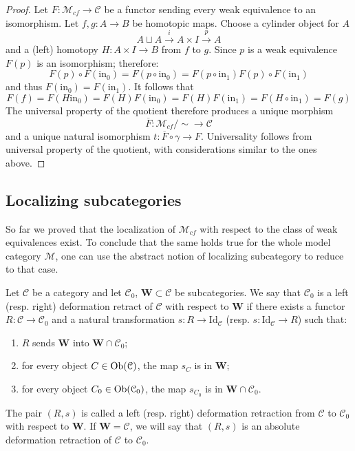 \begin{refsection}
\begin{proof}
Let $F \colon \mathcal M_{cf} \to \mathcal C$ be a functor sending every weak equivalence to an isomorphism. Let $f,g \colon A \to B$ be homotopic maps. Choose a cylinder object for $A$
\[
A \sqcup A \xrightarrow{i} A \times I \xrightarrow{p} A
\]
and a (left) homotopy $H \colon A \times I \to B$ from $f$ to $g$. Since $p$ is a weak equivalence $F(p)$ is an isomorphism; therefore:
\[
F(p) \circ F(\mathrm{in}_0) = F(p \circ \mathrm{in}_0) = F(p \circ \mathrm{in}_1) F(p) \circ F(\mathrm{in}_1)
\]
and thus $F(\mathrm{in}_0) = F(\mathrm{in}_1)$. It follows that
\[
F(f) = F(H \mathrm{in}_0) = F(H) F(\mathrm{in}_0) = F(H) F(\mathrm{in}_1) = F(H \circ \mathrm{in_1}) = F(g)
\]
The universal property of the quotient therefore produces a unique morphism
\[
\overline{F} \colon \mathcal M_{cf} / \sim \to \mathcal C
\]
and a unique natural isomorphism $t \colon \overline{F} \circ \gamma \to F$. Universality follows from universal property of the quotient, with considerations similar to the ones above.
\end{proof}

\subsection{Localizing subcategories}

So far we proved that the localization of $\mathcal M_{cf}$ with respect to the class of weak equivalences exist. To conclude that the same holds true for the whole model category $\mathcal M$, one can use the abstract notion of localizing subcategory to reduce to that case.

\begin{defin} \label{def localizing subcategories}
Let $\mathcal C$ be a category and let $\mathcal C_0$, $\mathbf W \subset \mathcal C$ be subcategories. We say that $\mathcal C_0$ is a left (resp. right) deformation retract of $\mathcal C$ with respect to $\mathbf W$ if there exists a functor $R \colon \mathcal C \to \mathcal C_0$ and a natural transformation $s \colon R \to \mathrm{Id}_{\mathcal C}$ (resp. $s \colon \mathrm{Id}_{\mathcal C} \to R$) such that:
\begin{enumerate}
\item $R$ sends $\mathbf W$ into $\mathbf W \cap \mathcal C_0$;
\item for every object $C \in \operatorname{Ob}(\mathcal C)$, the map $s_C$ is in $\mathbf W$;
\item for every object $C_0 \in \operatorname{Ob}(\mathcal C_0)$, the map $s_{C_0}$ is in $\mathbf W \cap \mathcal C_0$.
\end{enumerate}
The pair $(R,s)$ is called a left (resp. right) deformation retraction from $\mathcal C$ to $\mathcal C_0$ with respect to $\mathbf W$. If $\mathbf W = \mathcal C$, we will say that $(R,s)$ is an absolute deformation retraction of $\mathcal C$ to $\mathcal C_0$.
\end{defin}


\end{refsection}
